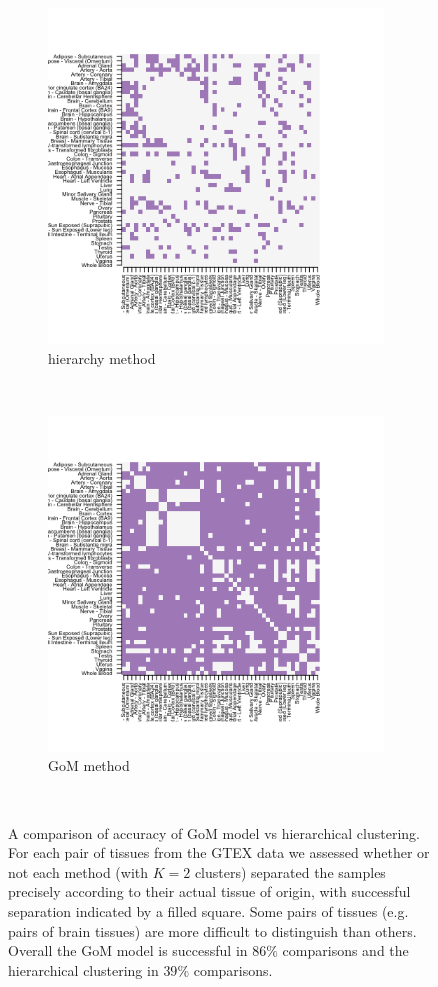 \documentclass[10pt,letterpaper]{article}
\begin{document}
  \begin{figure}[!h]
    \centering
    \begin{subfigure}[t]{0.5\textwidth}
        \centering
        \includegraphics[height=3.5in]{../plots/hierarchy_F_thin_0_1.png}
        \caption{hierarchy method}
    \end{subfigure}%
    ~
    \begin{subfigure}[t]{0.5\textwidth}
        \centering
        \includegraphics[height=3.5in]{../plots/admixture_F_thin_0_1.png}
        \caption{GoM method}
    \end{subfigure} \\
\caption{A comparison of accuracy of GoM model vs hierarchical clustering. For each pair of tissues from the GTEX data we assessed whether or not each method (with $K=2$ clusters) separated the samples precisely according to their actual tissue of origin, with successful separation indicated by a filled square. Some pairs of tissues (e.g. pairs of brain tissues) are more difficult to distinguish than others. Overall the GoM model is successful in $86 \%$ comparisons and the hierarchical clustering in $39 \%$ comparisons.}
\label{fig2}
\end{figure}
\end{document}
